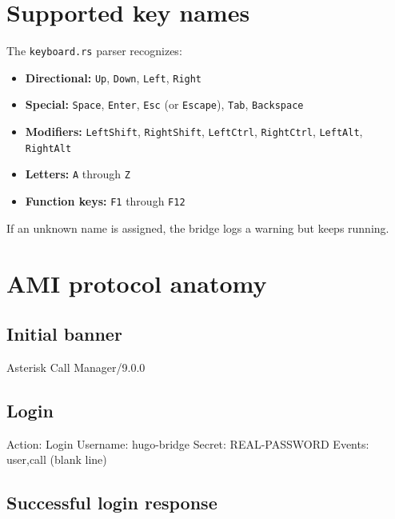 \section{Supported key names}

The \texttt{keyboard.rs} parser recognizes:

\begin{itemize}
  \item \textbf{Directional:} \texttt{Up}, \texttt{Down}, \texttt{Left}, \texttt{Right}
  \item \textbf{Special:} \texttt{Space}, \texttt{Enter}, \texttt{Esc} (or \texttt{Escape}), \texttt{Tab}, \texttt{Backspace}
  \item \textbf{Modifiers:} \texttt{LeftShift}, \texttt{RightShift}, \texttt{LeftCtrl}, \texttt{RightCtrl}, \texttt{LeftAlt}, \texttt{RightAlt}
  \item \textbf{Letters:} \texttt{A} through \texttt{Z}
  \item \textbf{Function keys:} \texttt{F1} through \texttt{F12}
\end{itemize}

If an unknown name is assigned, the bridge logs a warning but keeps running.

\section{AMI protocol anatomy}

\subsection{Initial banner}

\begin{plaincode}
Asterisk Call Manager/9.0.0
\end{plaincode}

\subsection{Login}

\begin{plaincode}
Action: Login
Username: hugo-bridge
Secret: REAL-PASSWORD
Events: user,call
(blank line)
\end{plaincode}

\subsection{Successful login response}

